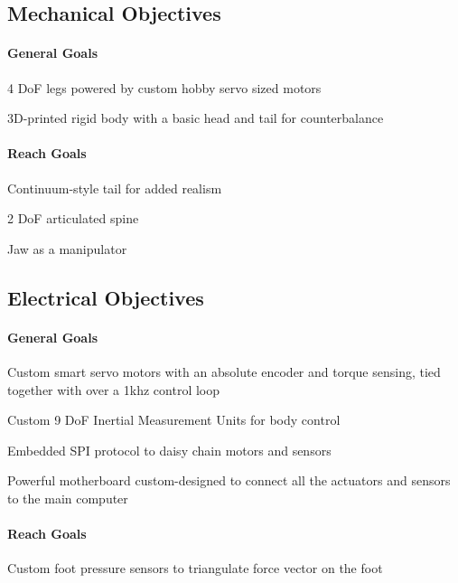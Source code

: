 
\subsection*{Mechanical Objectives}
\paragraph*{General Goals}
\begin{Deliverables}
    \item 4 DoF legs powered by custom hobby servo sized motors
    \item 3D-printed rigid body with a basic head and tail for counterbalance
\end{Deliverables}
\paragraph*{Reach Goals}
\begin{Deliverables}
    \item Continuum-style tail for added realism
    \item 2 DoF articulated spine
    \item Jaw as a manipulator
\end{Deliverables}

\subsection*{Electrical Objectives}
\paragraph*{General Goals}
\begin{Deliverables}
    \item Custom smart servo motors with an absolute encoder and torque sensing, tied together with over a 1khz control loop 
    \item Custom 9 DoF Inertial Measurement Units for body control
    \item Embedded SPI protocol to daisy chain motors and sensors
    \item Powerful motherboard custom-designed to connect all the actuators and sensors to the main computer
\end{Deliverables}
\paragraph*{Reach Goals}
\begin{Deliverables}
    \item Custom foot pressure sensors to triangulate force vector on the foot
\end{Deliverables}

